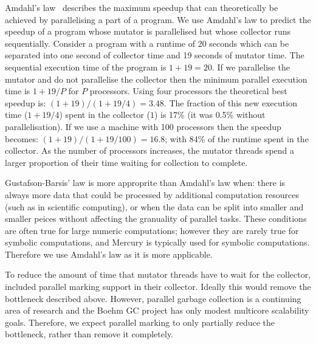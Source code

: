Amdahl's law~\citep{amdahl:1967:law} describes the maximum speedup that
can theoretically be achieved by parallelising a part of a program.
We use Amdahl's law to predict the speedup of a program whose
mutator is parallelised but whose collector runs sequentially.
Consider a program with a runtime of 20 seconds
which can be separated into one second of collector time and 19 seconds
of mutator time.
The sequential execution time of the program is $1 + 19 = 20$.
If we parallelise the mutator and do not parallelise the
collector then the minimum parallel execution time is $1 + 19/P$
for $P$ processors.
Using four processors the theoretical best speedup is:
$(1 + 19) / (1 + 19/4) = 3.48$.
The fraction of this new execution time ($1 + 19/4$) spent in the collector
($1$) is 17\% (it was 0.5\% without parallelisation).
If we use a machine with 100 processors then the speedup becomes:
$(1 + 19) / (1 + 19/100) = 16.8$;
with 84\% of the runtime spent in the collector.
As the number of processors increases,
the mutator threads spend a larger proportion of their time waiting for
collection to complete.

Gustafson-Barsis' law
\citep{gustafson:88:reevaluating-amdahl} is more approprite than
Amdahl's law when:
there is always more data that could be processed
by additional computation resources (such as in scientific computing),
or when the data can be split into smaller and smaller peices
without affecting the granuality of parallel tasks.
These conditions are often true for large numeric computations;
however they are rarely true for symbolic computations,
and Mercury is typically used for symbolic computations.
Therefore we use Amdahl's law as it is more applicable.

To reduce the amount of time that mutator threads have to wait for the
collector,
\citet{boehm:1988:gc} included parallel marking support in their collector.
Ideally this would remove the bottleneck described above.
However,
parallel garbage collection is a continuing area of research and
the Boehm GC project has only modest multicore scalability goals.
Therefore,
we expect parallel marking to only partially reduce the bottleneck,
rather than remove it completely.

